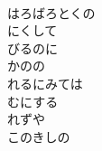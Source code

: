 \documentclass[10pt,b5j]{tarticle} %
\begin{document}
\begin{enumerate}
\begin{minipage}[c]{\blocksize}
    \end{minipage}
    \begin{minipage}[c]{\blocksize}
        
        \vspace{\linespace}
        \item~\\
        はろばろとくの\\
        にくして\\
        びるのに\\
        かのの\\
        れるにみては\\
        むにする\\
        れずや\\
        このきしの
    
    \end{minipage}
\end{enumerate} %
\end{document}
